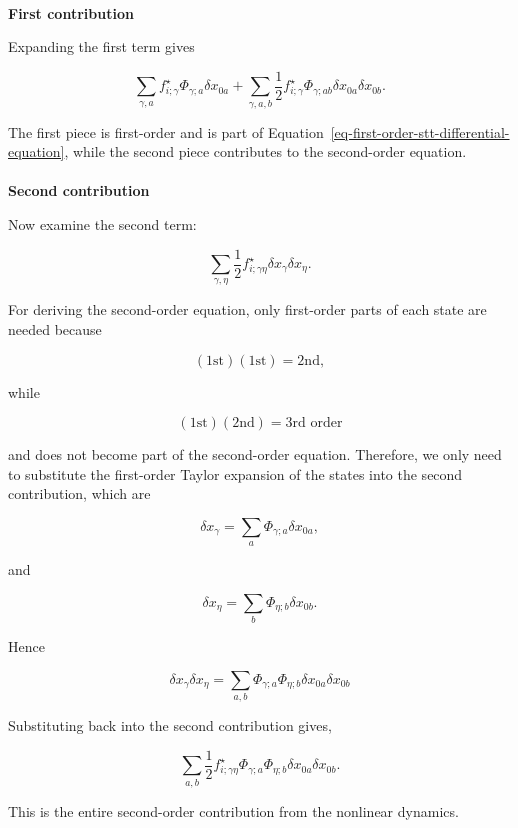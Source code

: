 \documentclass[
  letterpaper,
  DIV=11,
  numbers=noendperiod,
  oneside]{scrartcl}
\makeatletter
\let\oldparagraph\paragraph
\renewcommand{\paragraph}{
    \@ifstar
      \xxxParagraphStar
      \xxxParagraphNoStar
  }
\newcommand{\xxxParagraphStar}[1]{\oldparagraph*{#1}\mbox{}}
\newcommand{\xxxParagraphNoStar}[1]{\oldparagraph{#1}\mbox{}}
\makeatother
\begin{document}
\paragraph{\texorpdfstring{\textbf{First
contribution}}{First contribution}}\label{first-contribution}

Expanding the first term gives

\[
\sum_{\gamma,a}f^\star_{i;\gamma}
\Phi_{\gamma;a}\delta x_{0a}+\sum_{\gamma,a,b}\frac12
f^\star_{i;\gamma}
\Phi_{\gamma;ab}
\delta x_{0a}\delta x_{0b}.
\]

The first piece is first-order and is part of
Equation~\ref{eq-first-order-stt-differential-equation}, while the
second piece contributes to the second-order equation.

\paragraph{\texorpdfstring{\textbf{Second
contribution}}{Second contribution}}\label{second-contribution}

Now examine the second term:

\[
\sum_{\gamma,\eta}\frac12
f^\star_{i;\gamma\eta}
\delta x_\gamma\delta x_\eta.
\]

For deriving the second-order equation, only first-order parts of each
state are needed because

\[
(\text{1st})(\text{1st})=\text{2nd},
\]

while

\[
(\text{1st})(\text{2nd})
=\text{3rd order}
\]

and does not become part of the second-order equation. Therefore, we
only need to substitute the first-order Taylor expansion of the states
into the second contribution, which are

\[
\delta x_\gamma=\sum_a\Phi_{\gamma;a}\delta x_{0a},
\]

and

\[
\delta x_\eta=\sum_b\Phi_{\eta;b}\delta x_{0b}.
\]

Hence

\[
\delta x_\gamma\delta x_\eta=\sum_{a,b}\Phi_{\gamma;a}\Phi_{\eta;b}\delta x_{0a}\delta x_{0b}
\]

Substituting back into the second contribution gives,

\[
\sum_{a,b}\frac12
f^\star_{i;\gamma\eta}
\Phi_{\gamma;a}
\Phi_{\eta;b}
\delta x_{0a}\delta x_{0b}.
\]

This is the entire second-order contribution from the nonlinear
dynamics.
\end{document}
